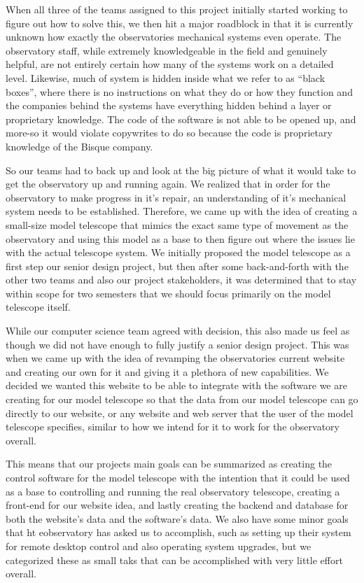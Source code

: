 \documentclass[12pt]{report}
\begin{document}
When all three of the teams assigned to this project initially started working to figure out how to solve this, we then hit a major roadblock in that it is currently unknown how exactly the observatories mechanical systems even operate. The observatory staff, while extremely knowledgeable in the field and genuinely helpful, are not entirely certain how many of the systems work on a detailed level. Likewise, much of system is hidden inside what we refer to as “black boxes”, where there is no instructions on what they do or how they function and the companies behind the systems have everything hidden behind a layer or proprietary knowledge. The code of the software is not able to be opened up, and more-so it would violate copywrites to do so because the code is proprietary knowledge of the Bisque company.

So our teams had to back up and look at the big picture of what it would take to get the observatory up and running again. We realized that in order for the observatory to make progress in it’s repair, an understanding of it’s mechanical system needs to be established. Therefore, we came up with the idea of creating a small-size model telescope that mimics the exact same type of movement as the observatory and using this model as a base to then figure out where the issues lie with the actual telescope system. We initially proposed the model telescope as a first step our senior design project, but then after some back-and-forth with the other two teams and also our project stakeholders, it was determined that to stay within scope for two semesters that we should focus primarily on the model telescope itself.

While our computer science team agreed with decision, this also made us feel as though we did not have enough to fully justify a senior design project. This was when we came up with the idea of revamping the observatories current website and creating our own for it and giving it a plethora of new capabilities. We decided we wanted this website to be able to integrate with the software we are creating for our model telescope so that the data from our model telescope can go directly to our website, or any website and web server that the user of the model telescope specifies, similar to how we intend for it to work for the observatory overall. 

This means that our projects main goals can be summarized as creating the control software for the model telescope with the intention that it could be used as a base to controlling and running the real observatory telescope, creating a front-end for our website idea, and lastly creating the backend and database for both the website’s data and the software’s data. We also have some minor goals that ht eobservatory has asked us to accomplish, such as setting up their system for remote desktop control and also operating system upgrades, but we categorized these as small taks that can be accomplished with very little effort overall.
\end{document}
